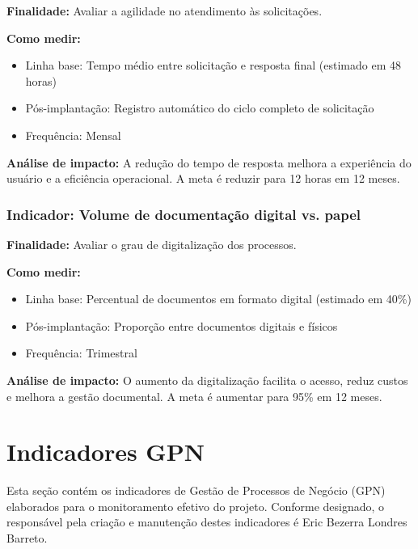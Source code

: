 \documentclass[12pt,a4paper]{article}
\begin{document}
\textbf{Finalidade:} Avaliar a agilidade no atendimento às solicitações.

\textbf{Como medir:} 
\begin{itemize}
    \item Linha base: Tempo médio entre solicitação e resposta final (estimado em 48 horas)
    \item Pós-implantação: Registro automático do ciclo completo de solicitação
    \item Frequência: Mensal
\end{itemize}

\textbf{Análise de impacto:} A redução do tempo de resposta melhora a experiência do usuário e a eficiência operacional. A meta é reduzir para 12 horas em 12 meses.

\subsubsection{Indicador: Volume de documentação digital vs. papel}

\textbf{Finalidade:} Avaliar o grau de digitalização dos processos.

\textbf{Como medir:} 
\begin{itemize}
    \item Linha base: Percentual de documentos em formato digital (estimado em 40\%)
    \item Pós-implantação: Proporção entre documentos digitais e físicos
    \item Frequência: Trimestral
\end{itemize}

\textbf{Análise de impacto:} O aumento da digitalização facilita o acesso, reduz custos e melhora a gestão documental. A meta é aumentar para 95\% em 12 meses.

\clearpage
\section{Indicadores GPN}

Esta seção contém os indicadores de Gestão de Processos de Negócio (GPN) elaborados para o monitoramento efetivo do projeto. Conforme designado, o responsável pela criação e manutenção destes indicadores é Eric Bezerra Londres Barreto.
\end{document}
